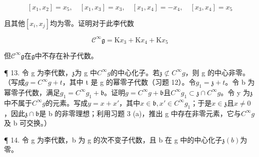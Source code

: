 \[
\left[ x _ {1}, x _ {2} \right] = x _ {5}, \quad \left[ x _ {1}, x _ {3} \right] = x _ {3}, \quad \left[ x _ {1}, x _ {4} \right] = - x _ {4}, \quad \left[ x _ {3}, x _ {4} \right] = x _ {5}
\]

且其他\([x_i, x_j]\)均为零。证明对于此李代数

\[
\mathcal {C} ^ {\infty} \mathfrak {g} = \mathrm{K} x _ {3} + \mathrm{K} x _ {4} + \mathrm{K} x _ {5}
\]

但\(\mathcal{C}^{\infty}\mathfrak{g}\)在\(\mathfrak{g}\)中不存在补子代数。

¶ 13. 令 g 为李代数，\(\mathfrak{z}\)为 g 中\(C^{\infty}g\)的中心化子。若\(\mathfrak{z} \not\subset C^{\infty}g\)，则 g 的中心非零。（写成\(g = C^{\infty}g + t\)，其中 t 是 g 的幂零子代数（习题 12）。令\(g_{1} = \mathfrak{z} + t\)。令 b 为幂零子代数，满足\(g_{1} = C^{\infty}g_{1} + \mathfrak{b}\)。证明\(g = C^{\infty}g + \mathfrak{b}\)且\(C^{\infty}g_{1} \subset \mathfrak{z} \cap C^{\infty}g\)。令 y 为\(\mathfrak{z}\)中不属于\(C^{\infty}g\)的元素。写成\(y = x + x'\)，其中\(x \in \mathfrak{b}, x' \in C^{\infty}g_{1}\)；于是\(x \in \mathfrak{z}\)且\(x \neq 0\)，因此\(\mathfrak{z} \cap \mathfrak{b}\)是 b 的非零理想；利用习题 3 (a)，推出 g 中存在非零元素，它与\(C^{\infty}g\)及 b 可交换。）

¶ 14. 令 g 为李代数，b 为 g 的次不变子代数，且 b 在 g 中的中心化子\(\mathfrak{z}(b)\)为零。

